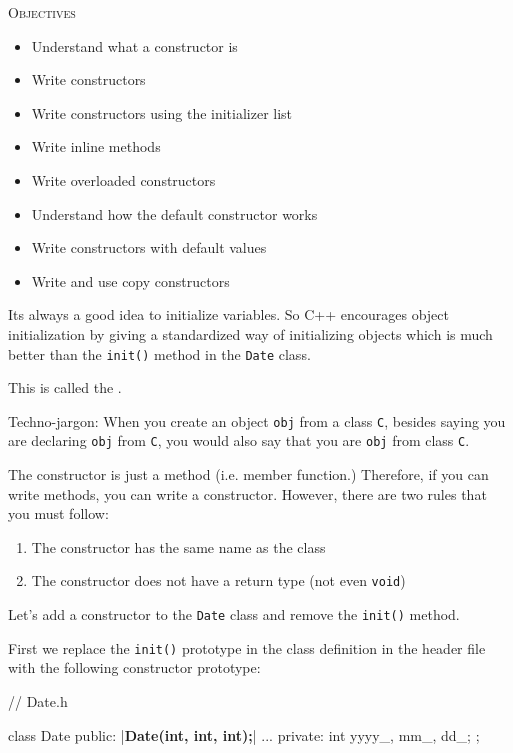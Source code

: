 \newpage{}

\textsc{Objectives}
\begin{itemize}
\item Understand what a constructor is
\item Write constructors
\item Write constructors using the initializer list
\item Write inline methods
\item Write overloaded constructors
\item Understand how the default constructor works
\item Write constructors with default values
\item Write and use copy constructors
\end{itemize}


\newpage{}

Its always a good idea to initialize variables. So C++ encourages
object initialization by giving a standardized way of initializing
objects which is much better than the \texttt{init()} method in the
\texttt{Date} class.

This is called the .

Techno-jargon: When you create an object \texttt{obj} from a class
\texttt{C}, besides saying you are declaring \texttt{obj} from \texttt{C}, you
would also say that you are  \texttt{obj} from class
\texttt{C}.

The constructor is just a method (i.e. member function.) Therefore, if
you can write methods, you can write a constructor. However, there are
two rules that you must follow:

\begin{enumerate}
\item The constructor has the same name as the class
\item The constructor does not have a return type (not even \texttt{void})
\end{enumerate}

Let's add a constructor to the \texttt{Date} class and remove the
\texttt{init()} method.

First we replace the \texttt{init()} prototype in the class definition in
the header file with the following constructor prototype:

\begin{consolethree}[escapeinside=||]
// Date.h

class Date
{
public:
    |\textbf{Date(int, int, int);}|
    ...
private:
    int yyyy_, mm_, dd_;
};
\end{consolethree}

